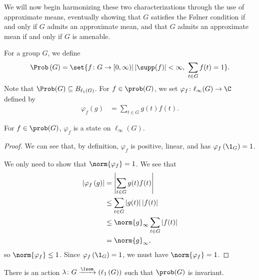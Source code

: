 We will now begin harmonizing these two characterizations through the use of approximate means, eventually showing that $G$ satisfies the Følner condition if and only if $G$ admits an approximate mean, and that $G$ admits an approximate mean if and only if $G$ is amenable.
\begin{definition}\label{def:state_on_prob_g}
  For a group $G$, we define
  \begin{align*}
    \Prob\left(G\right) = \set{f\colon G\rightarrow [0,\infty) | \left\vert \supp(f) \right\vert < \infty,~\sum_{t\in G}f(t) = 1}.
  \end{align*}
  Note that $\Prob(G) \subseteq B_{\ell_1\left(G\right)}$. For $f\in \prob(G)$, we set $\varphi_f\colon \ell_{\infty}(G)\rightarrow \C$ defined by
  \begin{align*}
    \varphi_f\left(g\right) &= \sum_{t\in G}g(t)f(t).
  \end{align*}
\end{definition}
\begin{fact}\label{fact:prob_g_state}
  For $f\in \prob(G)$, $\varphi_f$ is a state on $\ell_{\infty}\left(G\right)$.
\end{fact}
\begin{proof}
We can see that, by definition, $\varphi_f$ is positive, linear, and has $\varphi_f\left(\1_{G}\right) = 1$.\newline

We only need to show that $\norm{\varphi_f} = 1$. We see that
\begin{align*}
  \left\vert \varphi_f\left(g\right) \right\vert &= \left\vert \sum_{t\in G}g(t)f(t) \right\vert\\
                                                 &\leq \sum_{t\in G}\left\vert g(t) \right\vert\left\vert f(t) \right\vert\\
                                                 &\leq \norm{g}_{\infty}\sum_{t\in G}\left\vert f(t) \right\vert\\
                                                 &= \norm{g}_{\infty},
\end{align*}
so $\norm{\varphi_f} \leq 1$. Since $\varphi_f\left(\1_G\right) = 1$, we must have $\norm{\varphi_f} = 1$.
\end{proof}
\begin{proposition}
  There is an action $\lambda\colon G\xrightarrow \Isom\left(\ell_{1}\left(G\right)\right)$ such that $\prob(G)$ is invariant.
\end{proposition}
